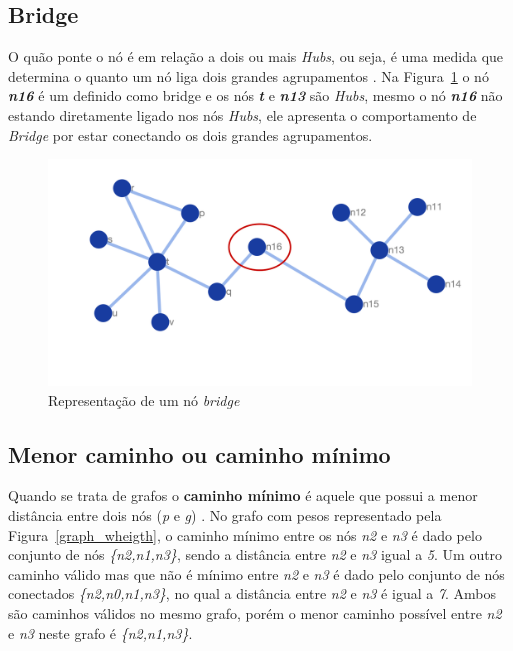 \subsection{Bridge}
O quão ponte o nó é em relação a dois ou mais \textsl{Hubs}, ou seja, é uma medida que determina o quanto um nó liga dois grandes agrupamentos \cite{Hwang2006}. Na Figura~\ref{graph_bridge} o nó \textbf{\textsl{n16}} é um definido como bridge e os nós \textbf{\textsl{t}} e \textbf{\textsl{n13}} são \textsl{Hubs}, mesmo o nó \textsl{\textbf{n16}} não estando diretamente ligado nos nós \textsl{Hubs}, ele apresenta o comportamento de \textsl{Bridge} por estar conectando os dois grandes agrupamentos.
%
\begin{figure}[ht!]
\centering
\includegraphics[width=\textwidth]{Images/graph_bridge.png}
\caption {Representação de um nó \textsl{bridge}
\label{graph_bridge}}
\end{figure}

\subsection{Menor caminho ou caminho mínimo}
Quando se trata de grafos o \textbf{caminho mínimo} é aquele que possui a menor distância entre dois nós (\textsl{p} e \textsl{g}) \cite{Dijkstra1959}. No grafo com pesos representado pela Figura~\ref{graph_wheigth}, o caminho mínimo entre os nós \textsl{n2} e \textsl{n3} é dado pelo conjunto de nós \textsl{\{n2,n1,n3\}}, sendo a distância entre \textsl{n2} e \textsl{n3} igual a \textsl{5}. Um outro caminho válido mas que não é mínimo entre \textsl{n2} e \textsl{n3} é dado pelo conjunto de nós conectados \textsl{\{n2,n0,n1,n3\}}, no qual a distância entre \textsl{n2} e \textsl{n3} é igual a \textsl{7}. Ambos são caminhos válidos no mesmo grafo, porém o menor caminho possível entre \textsl{n2} e \textsl{n3} neste grafo é \textsl{\{n2,n1,n3\}}.

